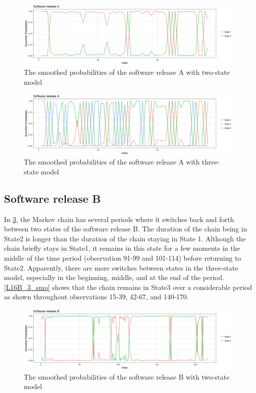 \begin{figure}[H]
\centering{}\includegraphics[scale=0.35]{picture/L16A_2_smo1}\caption{The smoothed probabilities of the software release A with two-state
model}
\label{L16A_2_smo}
\end{figure}

\begin{figure}[H]
\centering{}\includegraphics[scale=0.35]{picture/L16A_3_smo1}\caption{The smoothed probabilities of the software release A with three-state
model}
\label{L16A_3_smo}
\end{figure}


\subsection{Software release B}

In \ref{L16B_2_smo}, the Markov chain has several periods where it
switches back and forth between two states of the software release
B. The duration of the chain being in State2 is longer than the duration
of the chain staying in State 1. Although the chain briefly stays
in State1, it remains in this state for a few moments in the middle
of the time period (observation 91-99 and 101-114) before returning
to State2. Apparently, there are more switches between states in the
three-state model, especially in the beginning, middle, and at the
end of the period. \ref{L16B_3_smo} shows that the chain remains
in State3 over a considerable period as shown throughout observations
15-39, 42-67, and 140-170.

\begin{figure}[H]
\begin{centering}
\includegraphics[scale=0.35]{picture/L16B_2_smo1}
\par\end{centering}
\caption{The smoothed probabilities of the software release B with two-state
model}
\label{L16B_2_smo}
\end{figure}

